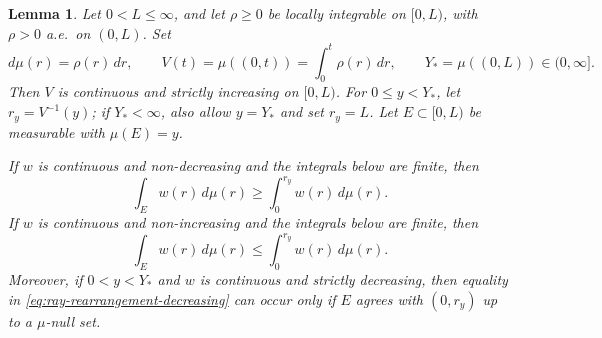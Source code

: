 \documentclass[11pt,letterpaper,reqno]{amsart}
\newtheorem{lemma}[theorem]{Lemma}
\theoremstyle{definition}
\begin{document}
\begin{lemma}\label{lem:raywise-rearrangement}
Let \(0<L\leq\infty\), and let \(\rho\geq0\) be locally integrable on
\([0,L)\), with \(\rho>0\) a.e.\ on \((0,L)\). Set
\[
        d\mu(r)=\rho(r)\,dr,
        \qquad
        V(t)=\mu((0,t))=\int_0^t\rho(r)\,dr,
        \qquad
        Y_*=\mu((0,L))\in(0,\infty].
\]
Then \(V\) is continuous and strictly increasing on \([0,L)\). For
\(0\leq y<Y_*\), let \(r_y=V^{-1}(y)\); if \(Y_*<\infty\), also allow
\(y=Y_*\) and set \(r_y=L\). Let \(E\subset[0,L)\) be measurable with
\(\mu(E)=y\).

If \(w\) is continuous and non-decreasing and the integrals below are
finite, then
\begin{equation}\label{eq:ray-rearrangement-increasing}
        \int_E w(r)\,d\mu(r)
        \geq
        \int_0^{r_y} w(r)\,d\mu(r).
\end{equation}
If \(w\) is continuous and non-increasing and the integrals below are
finite, then
\begin{equation}\label{eq:ray-rearrangement-decreasing}
        \int_E w(r)\,d\mu(r)
        \leq
        \int_0^{r_y} w(r)\,d\mu(r).
\end{equation}
Moreover, if \(0<y<Y_*\) and \(w\) is continuous and strictly decreasing,
then equality in \eqref{eq:ray-rearrangement-decreasing} can occur only if
\(E\) agrees with \((0,r_y)\) up to a \(\mu\)-null set.
\end{lemma}






\end{document}
